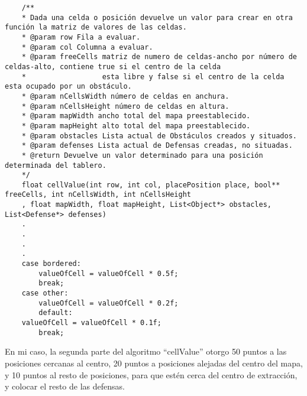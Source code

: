 \begin{lstlisting}
	/**
	* Dada una celda o posición devuelve un valor para crear en otra función la matriz de valores de las celdas.
	* @param row Fila a evaluar.
	* @param col Columna a evaluar.
	* @param freeCells matriz de numero de celdas-ancho por número de celdas-alto, contiene true si el centro de la celda
	*                  esta libre y false si el centro de la celda esta ocupado por un obstáculo.
	* @param nCellsWidth número de celdas en anchura.
	* @param nCellsHeight número de celdas en altura.
	* @param mapWidth ancho total del mapa preestablecido.
	* @param mapHeight alto total del mapa preestablecido.
	* @param obstacles Lista actual de Obstáculos creados y situados.
	* @param defenses Lista actual de Defensas creadas, no situadas.
	* @return Devuelve un valor determinado para una posición determinada del tablero.
	*/
	float cellValue(int row, int col, placePosition place, bool** freeCells, int nCellsWidth, int nCellsHeight
	, float mapWidth, float mapHeight, List<Object*> obstacles, List<Defense*> defenses)
	.
	.
	.
	.
	case bordered:
		valueOfCell = valueOfCell * 0.5f;
		break;
	case other:
		valueOfCell = valueOfCell * 0.2f;
		default:
	valueOfCell = valueOfCell * 0.1f;
		break;
\end{lstlisting}

En mi caso, la segunda parte del algoritmo ``cellValue'' otorgo 50 puntos a las posiciones cercanas al centro, 20 puntos a posiciones alejadas del centro del mapa, y 10 puntos al resto de posiciones, para que estén cerca del centro de extracción, y colocar el resto de las defensas.